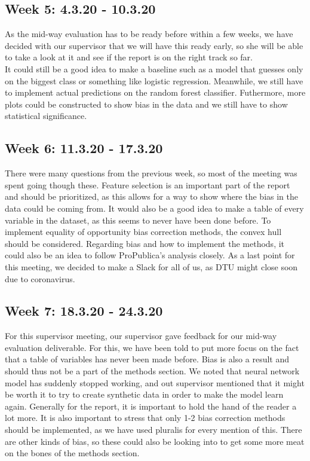 \documentclass[11pt, fleqn]{article}
\begin{document}
\subsection*{Week 5: 4.3.20 - 10.3.20}
As the mid-way evaluation has to be ready before within a few weeks, we have decided with our supervisor that we will have this ready early, so she will be able to take a look at it and see if the report is on the right track so far. \\
It could still be a good idea to make a baseline such as a model that guesses only on the biggest class or something like logistic regression. Meanwhile, we still have to implement actual predictions on the random forest classifier. Futhermore, more plots could be constructed to show bias in the data and we still have to show statistical significance.

\subsection*{Week 6: 11.3.20 - 17.3.20}
There were many questions from the previous week, so most of the meeting was spent going though these. Feature selection is an important part of the report and should be prioritized, as this allows for a way to show where the bias in the data could be coming from. It would also be a good idea to make a table of every variable in the dataset, as this seems to never have been done before. To implement equality of opportunity bias correction methods, the convex hull should be considered. Regarding bias and how to implement the methods, it could also be an idea to follow ProPublica's analysis closely. As a last point for this meeting, we decided to make a Slack for all of us, as DTU might close soon due to coronavirus.

\subsection*{Week 7: 18.3.20 - 24.3.20}
For this supervisor meeting, our supervisor gave feedback for our mid-way evaluation deliverable. For this, we have been told to put more focus on the fact that a table of variables has never been made before. Bias is also a result and should thus not be a part of the methods section. We noted that neural network model has suddenly stopped working, and out supervisor mentioned that it might be worth it to try to create synthetic data in order to make the model learn again. Generally for the report, it is important to hold the hand of the reader a lot more. It is also important to stress that only 1-2 bias correction methods should be implemented, as we have used pluralis for every mention of this. There are other kinds of bias, so these could also be looking into to get some more meat on the bones of the methods section.
\end{document}
